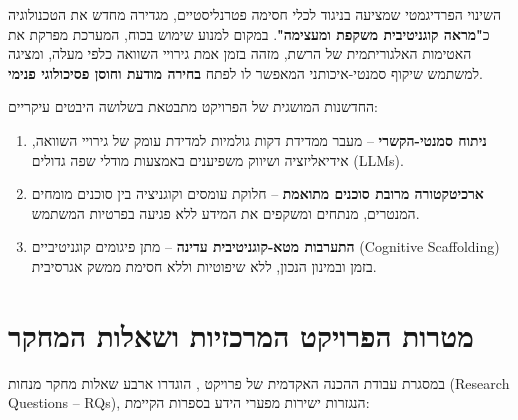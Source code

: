 \begin{agentbox}{השינוי הפרדיגמטי שמציעה \projectname{}}
בניגוד לכלי חסימה פטרנליסטיים, \projectname{} מגדירה מחדש את הטכנולוגיה כ\textbf{"מראה קוגניטיבית משקפת ומעצימה"}. במקום למנוע שימוש בכוח, המערכת מפרקת את האטימות האלגוריתמית של הרשת, מזהה בזמן אמת גירויי השוואה כלפי מעלה, ומציגה למשתמש שיקוף סמנטי-איכותני המאפשר לו לפתח \textbf{בחירה מודעת וחוסן פסיכולוגי פנימי}.
\end{agentbox}

החדשנות המושגית של הפרויקט מתבטאת בשלושה היבטים עיקריים:
\begin{enumerate}
    \item \textbf{ניתוח סמנטי-הקשרי} -- מעבר ממדידת דקות גולמיות למדידת עומק של גירויי השוואה, אידיאליזציה ושיווק משפיענים באמצעות מודלי שפה גדולים (\textenglish{LLMs}).
    \item \textbf{ארכיטקטורה מרובת סוכנים מתואמת} -- חלוקת עומסים וקוגניציה בין סוכנים מומחים המנטרים, מנתחים ומשקפים את המידע ללא פגיעה בפרטיות המשתמש.
    \item \textbf{התערבות מטא-קוגניטיבית עדינה} -- מתן פיגומים קוגניטיביים (\textenglish{Cognitive Scaffolding}) בזמן ובמינון הנכון, ללא שיפוטיות וללא חסימת ממשק אגרסיבית.
\end{enumerate}

\section{מטרות הפרויקט המרכזיות ושאלות המחקר}
\label{sec:intro_research_questions}
במסגרת עבודת ההכנה האקדמית של פרויקט \projectname{}, הוגדרו ארבע שאלות מחקר מנחות (\textenglish{Research Questions -- RQs}), הנגזרות ישירות מפערי הידע בספרות הקיימת:

